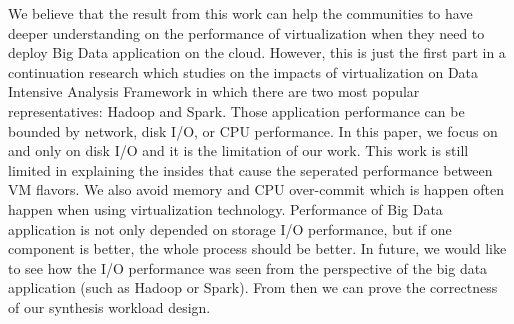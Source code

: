 \documentclass{acmsig}
\begin{document}
We believe that the result from this work can help the communities to have deeper understanding on the performance of virtualization when they need to deploy Big Data application on the cloud. However, this is just the first part in a continuation research which studies on the impacts of virtualization on Data Intensive Analysis Framework in which there are two most popular representatives: Hadoop and Spark. Those application performance can be bounded by network, disk I/O, or CPU performance. In this paper, we focus on and only on disk I/O and it is the limitation of our work. This work is still limited in explaining the insides that cause the seperated performance between VM flavors. We also avoid memory and CPU over-commit which is happen often happen when using virtualization technology. Performance of Big Data application is not only depended on storage I/O performance, but if one component is better, the whole process should be better. In future, we would like to see how the I/O performance was seen from the perspective of the big data application (such as Hadoop or Spark). From then we can prove the correctness of our synthesis workload design.




% 
% 
\end{document}
